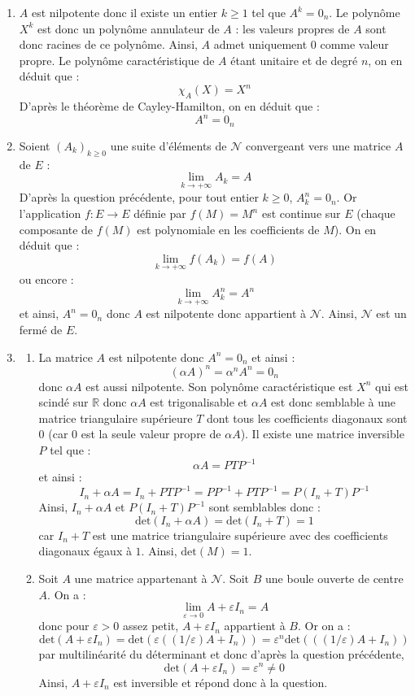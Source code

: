 \documentclass[a4paper,twoside,french,11pt]{VcCours}
\begin{document}
\begin{enumerate}
\item $A$ est nilpotente donc il existe un entier $k \geq 1$ tel que $A^k=0_n$. Le polynôme $X^k$ est donc un polynôme annulateur de $A$ : les valeurs propres de $A$ sont donc racines de ce polynôme. Ainsi, $A$ admet uniquement $0$ comme valeur propre. Le polynôme caractéristique de $A$ étant unitaire et de degré $n$, on en déduit que :
$$ \chi_A(X)=X^n$$
D'après le théorème de Cayley-Hamilton, on en déduit que :
$$ A^n=0_n$$
\item Soient $(A_k)_{k \geq 0}$ une suite d'éléments de $\mathcal{N}$ convergeant vers une matrice $A$ de $E$ :
$$ \lim_{k \rightarrow + \infty} A_k = A$$
D'après la question précédente, pour tout entier $k \geq 0$, $A_k^n=0_n$. Or l'application $f : E \rightarrow E$ définie par $f(M)=M^n$ est continue sur $E$ (chaque composante de $f(M)$ est polynomiale en les coefficients de $M$). On en déduit que :
$$ \lim_{k \rightarrow + \infty} f(A_k) = f(A)$$
ou encore :
$$ \lim_{k \rightarrow + \infty} A_k^n = A^n$$
et ainsi, $A^n=0_n$ donc $A$ est nilpotente donc appartient à $\mathcal{N}$. Ainsi, $\mathcal{N}$ est un fermé de $E$.
\item

\begin{enumerate}
\item La matrice $A$ est nilpotente donc $A^n=0_n$ et ainsi :
$$( \alpha A)^n = \alpha^n A^n = 0_n$$
donc $\alpha A$ est aussi nilpotente. Son polynôme caractéristique est $X^n$ qui est scindé sur $\mathbb{R}$ donc $\alpha A$ est trigonalisable et $\alpha A$ est donc semblable à une matrice triangulaire supérieure $T$ dont tous les coefficients diagonaux sont $0$ (car $0$ est la seule valeur propre de $\alpha A$). Il existe une matrice inversible $P$ tel que :
$$ \alpha A = P TP^{-1}$$
et ainsi :
$$ I_n+ \alpha A = I_n + PTP^{-1} = PP^{-1}+ PTP^{-1} = P(I_n+ T)P^{-1}$$
Ainsi, $I_n+ \alpha A$ et $P(I_n+ T)P^{-1}$ sont semblables donc :
$$ \textrm{det}(I_n+ \alpha A) = \textrm{det}(I_n+ T)=1$$
car $I_n+T$ est une matrice triangulaire supérieure avec des coefficients diagonaux égaux à $1$.
Ainsi, $\textrm{det}(M)=1$.
\item Soit $A$ une matrice appartenant à $\mathcal{N}$. Soit $B$ une boule ouverte de centre $A$. On a :
$$ \lim_{\varepsilon \rightarrow 0} A+ \varepsilon I_n = A$$
donc pour $\varepsilon>0$ assez petit, $A+ \varepsilon I_n$ appartient à $B$. Or on a :
$$ \textrm{det}(A+ \varepsilon I_n) = \textrm{det}(\varepsilon((1/\varepsilon)A+  I_n)) = \varepsilon^n \textrm{det}(((1/\varepsilon)A+  I_n))$$
par multilinéarité du déterminant et donc d'après la question précédente,
$$ \textrm{det}(A+ \varepsilon I_n)  = \varepsilon^n \neq 0$$
Ainsi, $A+ \varepsilon I_n$ est inversible et répond donc à la question.



\end{enumerate}
\end{enumerate}
\end{document}
